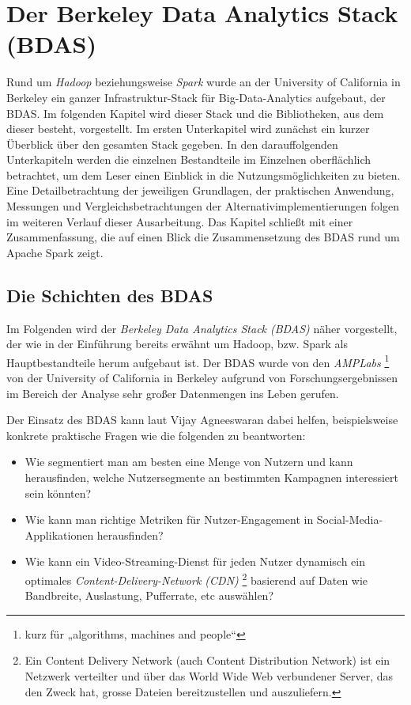 \chapter{Der Berkeley Data Analytics Stack (BDAS)}
\label{chapter:grundlagen des BDAS}


Rund um \textit{Hadoop} beziehungsweise \textit{Spark} wurde an der University of California in Berkeley ein ganzer Infrastruktur-Stack für Big-Data-Analytics aufgebaut, der BDAS. Im folgenden Kapitel wird dieser Stack und die Bibliotheken, aus dem dieser besteht, vorgestellt. Im ersten Unterkapitel wird zunächst ein kurzer Überblick über den gesamten Stack gegeben. In den darauffolgenden Unterkapiteln werden die einzelnen Bestandteile im Einzelnen oberflächlich betrachtet, um dem Leser einen Einblick in die Nutzungsmöglichkeiten zu bieten. Eine Detailbetrachtung der jeweiligen Grundlagen, der praktischen Anwendung, Messungen und Vergleichsbetrachtungen der Alternativimplementierungen folgen im weiteren Verlauf dieser Ausarbeitung. Das Kapitel schließt mit einer Zusammenfassung, die auf einen Blick die Zusammensetzung des BDAS rund um Apache Spark zeigt. 


\section{Die Schichten des BDAS}
\label{section:schichten des BDAS}

	
	Im Folgenden wird der \textit{Berkeley Data Analytics Stack (BDAS)} näher vorgestellt, der wie in der Einführung bereits erwähnt um Hadoop, bzw. Spark als Hauptbestandteile herum aufgebaut ist. Der BDAS wurde von den \textit{AMPLabs} \footnote{kurz für „algorithms, machines and people“} von der University of California in Berkeley aufgrund von Forschungsergebnissen im Bereich der Analyse sehr großer Datenmengen ins Leben gerufen. 

Der Einsatz des BDAS kann laut Vijay Agneeswaran  dabei helfen, beispielsweise konkrete praktische Fragen wie die folgenden zu beantworten: 

\begin{itemize}
		\item Wie segmentiert man am besten eine Menge von Nutzern und kann herausfinden, welche Nutzersegmente an bestimmten Kampagnen interessiert sein könnten?
		\item Wie kann man richtige Metriken für Nutzer-Engagement in Social-Media-Applikationen herausfinden?
		\item Wie kann ein Video-Streaming-Dienst für jeden Nutzer dynamisch ein optimales \textit{Content-Delivery-Network (CDN)} \footnote{Ein Content Delivery Network (auch Content Distribution Network) ist ein Netzwerk verteilter und über das World Wide Web verbundener Server, das den Zweck hat, grosse Dateien bereitzustellen und auszuliefern.} basierend auf Daten wie Bandbreite, Auslastung, Pufferrate, etc auswählen?
		
\end{itemize}	


